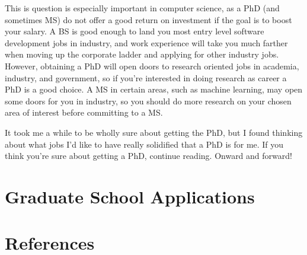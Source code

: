 \documentclass[12pt]{article}
\begin{document}
This is question is especially important in computer science, as a PhD (and sometimes MS) do not offer a good return on investment if the goal is to boost your salary. A BS is good enough to land you most entry level software development jobs in industry, and work experience will take you much farther when moving up the corporate ladder and applying for other industry jobs. However, obtaining a PhD will open doors to research oriented jobs in academia, industry, and government, so if you're interested in doing research as career a PhD is a good choice. \cite{robertsonwebsite} A MS in certain areas, such as machine learning, may open some doors for you in industry, so you should do more research on your chosen area of interest before committing to a MS.

It took me a while to be wholly sure about getting the PhD, but I found thinking about what jobs I'd like to have really solidified that a PhD is for me. If you think you're sure about getting a PhD, continue reading. Onward and forward!

\section{Graduate School Applications}

\section{References}

\printbibliography[heading=none]
\end{document}
